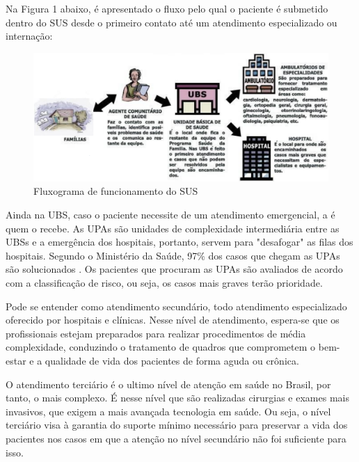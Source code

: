    Na Figura 1 abaixo, é apresentado o fluxo pelo qual o paciente é submetido dentro do SUS desde o primeiro contato até um atendimento especializado ou internação:
    
     \begin{figure}[htbp]
        	\centering
            \caption{Fluxograma de funcionamento do SUS}
            \label{fig:images/fluxograma-trajetoria-usf-pe}
            \includegraphics[width=0.9\linewidth]{images/funcionamento-sus.png}
        \end{figure}
    
    Ainda na UBS, caso o paciente necessite de um atendimento emergencial, a  é quem o recebe. As UPAs são unidades de complexidade intermediária entre  as UBSs e a emergência dos hospitais, portanto, servem para "desafogar" as filas dos hospitais. Segundo o Ministério da Saúde, 97\% dos casos que chegam as UPAs são solucionados \cite{BRASIL2012}. Os pacientes que procuram as UPAs são avaliados de acordo com a classificação de risco, ou seja, os casos mais graves terão prioridade.
    
    Pode se entender como atendimento secundário, todo atendimento especializado oferecido por hospitais e clínicas. Nesse nível de atendimento,  espera-se que os profissionais estejam preparados para realizar procedimentos de média complexidade, conduzindo o tratamento de quadros que comprometem o bem-estar e a qualidade de vida dos pacientes de forma aguda ou crônica.
    
    O atendimento terciário é o ultimo nível de atenção em saúde no Brasil, por tanto, o mais complexo. É nesse nível que são realizadas cirurgias e exames mais invasivos, que exigem a mais avançada tecnologia em saúde. Ou seja, o nível terciário visa à garantia do suporte mínimo necessário para preservar a vida dos pacientes nos casos em que a atenção no nível secundário não foi suficiente para isso.

